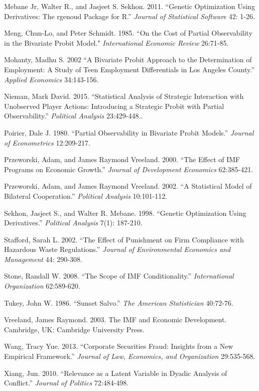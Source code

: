 \documentclass[10pt]{article}
\begin{document}
\begin{hangparas}{.25in}{1}
Mebane Jr, Walter R., and Jasjeet S. Sekhon. 2011. ``Genetic Optimization Using Derivatives: The rgenoud Package for R.'' \textit{Journal of Statistical Software} 42: 1-26.

Meng, Chun-Lo, and Peter Schmidt. 1985. ``On the Cost of Partial Observability in the Bivariate Probit Model." \textit{International Economic Review} 26:71-85.

Mohanty, Madhu S. 2002 ``A Bivariate Probit Approach to the Determination of Employment: A Study of Teen Employment Differentials in Los Angeles County.'' \textit{Applied Economics} 34:143-156.

Nieman, Mark David. 2015. ``Statistical Analysis of Strategic Interaction with Unobserved Player Actions: Introducing a Strategic Probit with Partial Observability.'' \textit{Political Analysis} 23:429-448..

Poirier, Dale J. 1980. ``Partial Observability in Bivariate Probit Models.'' \textit{Journal of Econometrics} 12:209-217.

Przeworski, Adam, and James Raymond Vreeland. 2000. ``The Effect of IMF Programs on Economic Growth.'' \textit{Journal of Development Economics} 62:385-421.

Przeworski, Adam, and James Raymond Vreeland. 2002. ``A Statistical Model of Bilateral Cooperation.'' \textit{Political Analysis} 10:101-112.

Sekhon, Jasjeet S., and Walter R. Mebane. 1998. ``Genetic Optimization Using Derivatives.'' \textit{Political Analysis} 7(1): 187-210.

Stafford, Sarah L. 2002. ``The Effect of Punishment on Firm Compliance with Hazardous Waste Regulations.'' \textit{Journal of Environmental Economics and Management} 44: 290-308.

Stone, Randall W. 2008. ``The Scope of IMF Conditionality.'' \textit{International Organization} 62:589-620.

Tukey, John W. 1986. ``Sunset Salvo.'' \textit{The American Statistician} 40:72-76.

Vreeland, James Raymond. 2003. The IMF and Economic Development. Cambridge, UK: Cambridge University Press.

Wang, Tracy Yue. 2013. ``Corporate Securities Fraud: Insights from a New Empirical Framework.'' \textit{Journal of Law, Economics, and Organization} 29:535-568.

Xiang, Jun. 2010. ``Relevance as a Latent Variable in Dyadic Analysis of Conflict.'' \textit{Journal of Politics} 72:484-498.

\end{hangparas}
\end{document}
